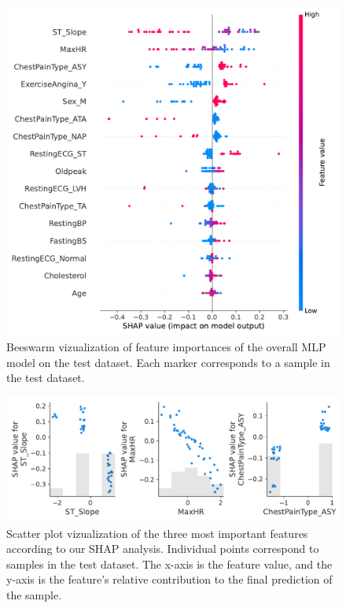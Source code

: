 \begin{figure}
    \centering
    \includegraphics[width=1\columnwidth]{images/shap_beeswarm.pdf}
    \caption{Beeswarm vizualization of feature importances of the overall MLP model on the test dataset. Each marker corresponds to a sample in the test dataset.}
    \label{fig:shap_beeswarm}
\end{figure}
\begin{figure}
    \centering
    \includegraphics[width=1\columnwidth]{images/shap_scatter.pdf}
    \caption{Scatter plot vizualization of the three most important features according to our SHAP analysis. Individual points correspond to samples in the test dataset. The x-axis is the feature value, and the y-axis is the feature's relative contribution to the final prediction of the sample.}
    \label{fig:shap_scatter}
\end{figure}


